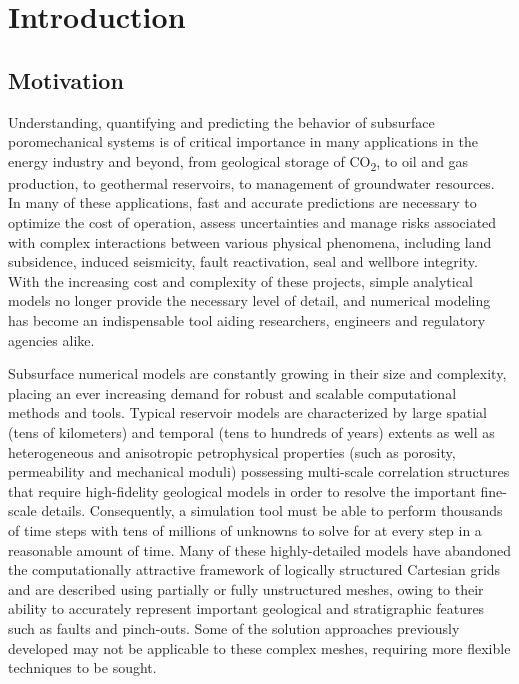 \chapter{Introduction}
\label{ch:introduction}

\section{Motivation}

Understanding, quantifying and predicting the behavior of subsurface poromechanical systems is of critical importance in many applications in the energy industry and beyond, from geological storage of CO\textsubscript{2}, to oil and gas production, to geothermal reservoirs, to management of groundwater resources.   In many of these applications, fast and accurate predictions are necessary to optimize the cost of operation, assess uncertainties and manage risks associated with complex interactions between various physical phenomena, including land subsidence, induced seismicity, fault reactivation, seal and wellbore integrity.   With the increasing cost and complexity of these projects, simple analytical models no longer provide the necessary level of detail, and numerical modeling has become an indispensable tool aiding researchers, engineers and regulatory agencies alike.

Subsurface numerical models are constantly growing in their size and complexity, placing an ever increasing demand for robust and scalable computational methods and tools.   Typical reservoir models are characterized by large spatial (tens of kilometers) and temporal (tens to hundreds of years) extents as well as heterogeneous and anisotropic petrophysical properties (such as porosity, permeability and mechanical moduli) possessing multi-scale correlation structures that require high-fidelity geological models in order to resolve the important fine-scale details.   Consequently, a simulation tool must be able to perform thousands of time steps with tens of millions of unknowns to solve for at every step in a reasonable amount of time.   Many of these highly-detailed models have abandoned the computationally attractive framework of logically structured Cartesian grids and are described using partially or fully unstructured meshes, owing to their ability to accurately represent important geological and stratigraphic features such as faults and pinch-outs.   Some of the solution approaches previously developed may not be applicable to these complex meshes, requiring more flexible techniques to be sought.

